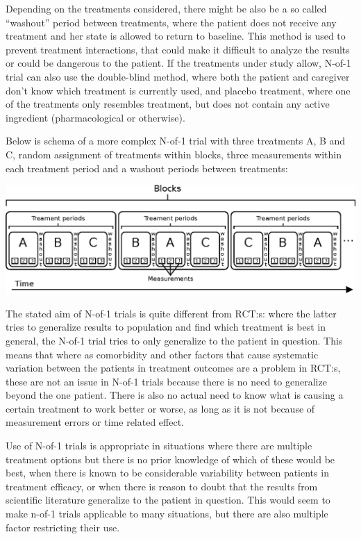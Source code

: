 \documentclass[12pt,a4paper,leqno]{report}
\theoremstyle{plain}
\theoremstyle{definition}
\theoremstyle{remark}
\begin{document}
Depending on
the treatments considered, there might be also be a so called ``washout'' period
between treatments, where the patient does not receive any treatment and her state is
allowed to return to baseline. This method is used to prevent treatment
interactions, that could make it difficult to analyze the results or could be
dangerous to the patient. If the treatments under study allow, N-of-1 trial can
also use the double-blind method, where both the patient and caregiver don't know
which treatment is currently used, and placebo treatment, where one of the
treatments only resembles treatment, but does not contain any active
ingredient (pharmacological or otherwise).

Below is schema of a more complex
N-of-1 trial with three treatments A, B and C, random assignment of treatments within
blocks, three measurements within each treatment period and a washout periods between treatments:

\bigskip
{
    \centering
    \includegraphics{n-of-1_schema.eps}
    \par
}
\bigskip

The stated aim of N-of-1 trials is quite different from RCT:s: where the latter
tries to generalize results to population and find which treatment is best in
general, the N-of-1 trial tries to only generalize to the patient in question.
This means that where as comorbidity and other factors that cause
systematic variation between the patients in treatment outcomes are a problem
in RCT:s, these are not an issue in N-of-1 trials because there is no need to
generalize beyond the one patient. There is also no actual need to know
what is causing a certain treatment to work better or worse, as long
as it is not because of measurement errors or time related effect.

Use of N-of-1 trials is appropriate in situations where there are multiple
treatment options but there is no prior knowledge of which of these would be
best, when there is known to be considerable variability between patients in
treatment efficacy, or when there is reason to doubt that the results from
scientific literature generalize to the patient in question\cite{nofone}. This would seem to
make n-of-1 trials applicable to many situations, but there are also
multiple factor restricting their use\cite{nofone}.
\end{document}
